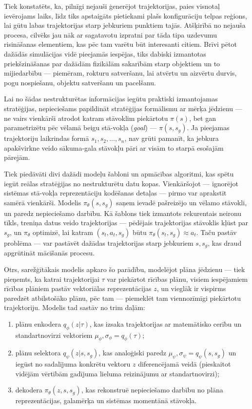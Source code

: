 \documentclass[12pt, a4paper]{article}
\numberwithin{equation}{section} %
\begin{document}
Tiek konstatēts, ka, pilnīgi nejauši ģenerējot trajektorijas, paies visnotaļ ievērojams laiks, līdz tiks apstaigāts pietiekami plašs konfigurāciju telpas reģions, lai gūtu labas trajektorijas starp jebkuriem punktiem tajās. Atšķirībā no nejauša procesa, cilvēks jau nāk ar sagatavotu izpratni par tāda tipa uzdevumu risināšanas elementiem, kas pēc tam varētu būt interesanti citiem. Brīvi pētot dažādās simulācijas vidē pieejamās iespējas, tiks dabiski izmantotas priekšzināšanas par dažādām fizikālām sakarībām starp objektiem un to mijiedarbību --- piemēram, rokturu satveršanu, lai atvērtu un aizvērtu durvis, pogu nospiešanu, objektu satveršanu un pacelšanu.

Lai no šādas nestrukturētas informācijas iegūtu praktiski izmantojamas stratēģijas, nepieciešams papildināt stratēģijas formālismu ar mērķa jēdzienu --- ne vairs vienkārši atrodot katram stāvoklim piekārtotu $\pi(s)$, bet gan parametrizētu pēc vēlamā beigu stā-vokļa (\textit{goal}) --- $\pi(s,s_{g})$. Ja pieejamas trajektoriju laikrindas formā $s_1, s_2, ..., s_n$, nav grūti pamanīt, ka jebkura apakšvirkne veido sākuma-gala stāvokļu pāri ar visām to starpā esošajām pārejām.

Tiek piedāvāti divi dažādi modeļu šabloni un apmācības algoritmi, kas spētu iegūt reālas stratēģijas no nestrukturētu datu kopas. Vienkāršojot --- ignorējot sistēmas stā-vokļa reprezentāciju kodēšanas detaļas --- pirmo var aprakstīt samērā vienkārši. Modelis $\pi_{\theta}(s,s_g)$ saņem ievadē pašreizējo un vēlamo stāvokli, un paredz nepieciešamo darbību. Kā šablons tiek izmantots rekurentais neironu tīkls, treniņa datus veido trajektorijas --- pēdējais trajektorijas stāvoklis kļūst par $s_g$, un $\pi_{\theta}$ optimizē, lai katram $(s_t, a_t, s_g)$ būtu $\pi_{\theta}(s_t, s_g) \approx a_t$. Taču pastāv problēma --- var pastāvēt dažādas trajektorijas starp jebkuriem $s, s_g$, kas draud apgrūtināt mācīšanās procesu.

Otrs, sarežģītākais modelis apkaro šo parādību, modelējot plāna jēdzienu --- tiek pieņemts, ka katrai trajektorijai $\tau$ var piekārtot rīcības plānu, visiem iespējamiem rīcības plāniem pastāv vektoriālas reprezentācijas $z$, un vieglāk ir vispirms paredzēt atbilstošāko plānu, pēc tam --- piemeklēt tam viennozīmīgi piekārtotu trajektoriju. Modelis tad sastāv no trim daļām:

\begin{enumerate}
    \item plānu enkodera $q_{\phi}(z \vert \tau)$, kas izsaka trajektorijas ar matemātisko cerību un standartnovirzi vektoriem $\mu_{\phi}, \sigma_{\phi} = q_{\phi}(\tau)$;
    \item plānu selektora $q_{\psi}(z \vert s, s_g)$, kas analoģiski paredz $\mu_{\psi}, \sigma_{\psi} = q_{\psi}(s, s_g)$ un iegūst no sadalījuma konkrētu vektoru $z$ diferencējamā veidā (pieskaitot vidējām vērtībām gadījuma lieluma reizinājumu ar standartnovirzi);
    \item dekodera $\pi_{\theta}(z, s, s_g)$, kas rekonstruē nepieciešamo darbību no plāna reprezentācijas, galamērķa un sistēmas momentānā stāvokļa.
\end{enumerate}
\end{document}
